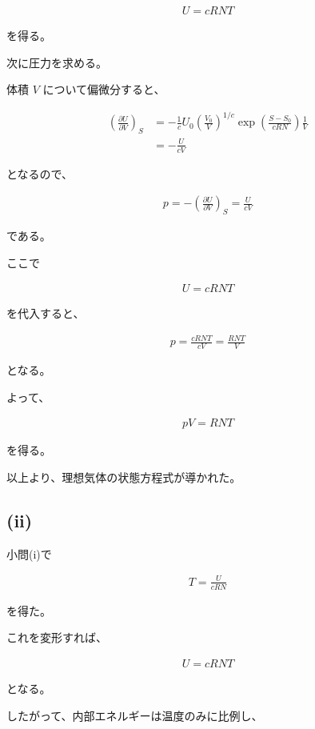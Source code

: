 \documentclass[platex,dvipdfmx,a4paper]{jsarticle}
\begin{document}
\begin{align*}
U=cRNT
\end{align*}

を得る。

次に圧力を求める。

体積 $V$ について偏微分すると、

\begin{align*}
\left(
\frac{\partial U}{\partial V}
\right)_S
&=
-\frac1c
U_0
\left(
\frac{V_0}{V}
\right)^{1/c}
\exp\left(
\frac{S-S_0}{cRN}
\right)
\frac1V \\
&=
-\frac{U}{cV}
\end{align*}

となるので、

\begin{align*}
p
=
-\left(
\frac{\partial U}{\partial V}
\right)_S
=
\frac{U}{cV}
\end{align*}

である。

ここで

\begin{align*}
U=cRNT
\end{align*}

を代入すると、

\begin{align*}
p
=
\frac{cRNT}{cV}
=
\frac{RNT}{V}
\end{align*}

となる。

よって、

\begin{align*}
pV=RNT
\end{align*}

を得る。

以上より、理想気体の状態方程式が導かれた。

\subsection{(ii)}

小問(i)で

\begin{align*}
T
=
\frac{U}{cRN}
\end{align*}

を得た。

これを変形すれば、

\begin{align*}
U=cRNT
\end{align*}

となる。

したがって、内部エネルギーは温度のみに比例し、
\end{document}
